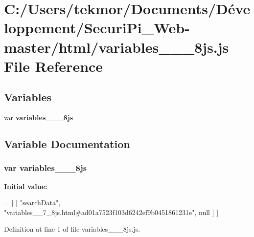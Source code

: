 \section{C\+:/\+Users/tekmor/\+Documents/\+Développement/\+Securi\+Pi\+\_\+\+Web-\/master/html/variables\+\_\+\+\_\+\_\+8js.js File Reference}
\label{variables____7__8js_8js}
\subsection*{Variables}
\begin{DoxyCompactItemize}
\item 
var {\bf variables\+\_\+\+\_\+\_\+8js}
\end{DoxyCompactItemize}


\subsection{Variable Documentation}
\subsubsection[{variables\+\_\+\+\_\+7\+\_\+8js}]{\setlength{\rightskip}{0pt plus 5cm}var variables\+\_\+\+\_\+\_\+8js}\label{variables____7__8js_8js_ae716258ec42151674fd88f10861c3980}
{\bfseries Initial value\+:}
\begin{DoxyCode}
=
[
    [ \textcolor{stringliteral}{"searchData"}, \textcolor{stringliteral}{"variables\_\_7\_8js.html#ad01a7523f103d6242ef9b0451861231e"}, null ]
]
\end{DoxyCode}


Definition at line 1 of file variables\+\_\+\+\_\+\_\+8js.\+js.

